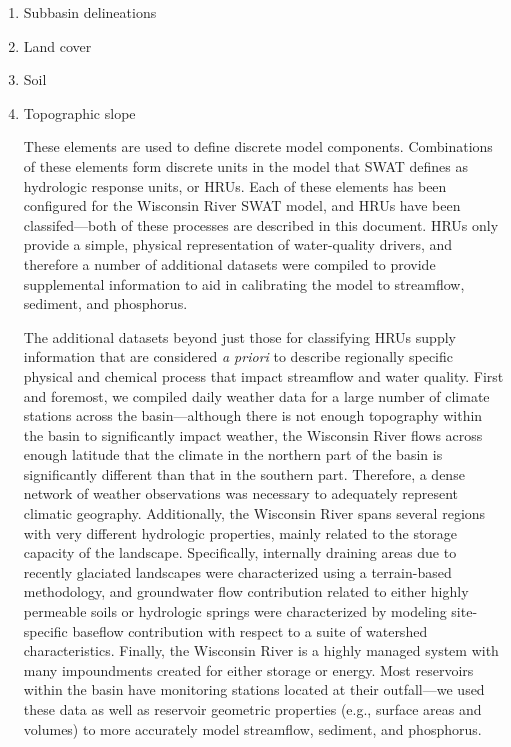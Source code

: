 \begin{enumerate}
	\item Subbasin delineations
	\item Land cover
	\item Soil
	\item Topographic slope
\begin{enumerate}

These elements are used to define discrete model components. Combinations of these elements form discrete units in the model that SWAT defines as hydrologic response units, or HRUs. Each of these elements has been configured for the Wisconsin River SWAT model, and HRUs have been classifed---both of these processes are described in this document. HRUs only provide a simple, physical representation of water-quality drivers, and therefore a number of additional datasets were compiled to provide supplemental information to aid in calibrating the model to streamflow, sediment, and phosphorus.

The additional datasets beyond just those for classifying HRUs supply information that are considered \textit{a priori} to describe regionally specific physical and chemical process that impact streamflow and water quality. First and foremost, we compiled daily weather data for a large number of climate stations across the basin---although there is not enough topography within the basin to significantly impact weather, the Wisconsin River flows across enough latitude that the climate in the northern part of the basin is significantly different than that in the southern part. Therefore, a dense network of weather observations was necessary to adequately represent climatic geography. Additionally, the Wisconsin River spans several regions with very different hydrologic properties, mainly related to the storage capacity of the landscape. Specifically, internally draining areas due to recently glaciated landscapes were characterized using a terrain-based methodology, and groundwater flow contribution related to either highly permeable soils or hydrologic springs were characterized by modeling site-specific baseflow contribution with respect to a suite of watershed characteristics. Finally, the Wisconsin River is a highly managed system with many impoundments created for either storage or energy. Most reservoirs within the basin have monitoring stations located at their outfall---we used these data as well as reservoir geometric properties (e.g., surface areas and volumes) to more accurately model streamflow, sediment, and phosphorus.


\end{enumerate}
\end{enumerate}
